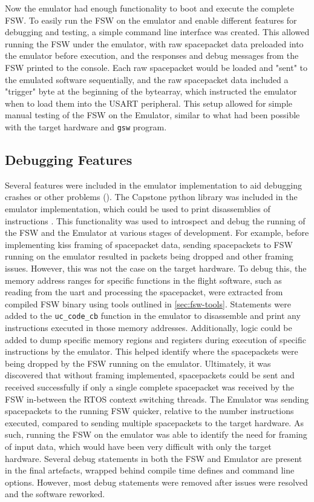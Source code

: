 \documentclass[../report.tex]{subfiles}
\begin{document}
Now the emulator had enough functionality to boot and execute the complete FSW.
To easily run the FSW on the emulator and enable different features for
debugging and testing, a simple command line interface was created. This allowed
running the FSW under the emulator, with raw spacepacket data preloaded into
the emulator before execution, and the responses and debug messages from the
FSW printed to the console. Each raw spacepacket would be loaded and "sent" to
the emulated software sequentially, and the raw spacepacket data included a
"trigger" byte at the beginning of the bytearray, which instructed the emulator
when to load them into the USART peripheral. This setup allowed for simple
manual testing of the FSW on the Emulator, similar to what had been possible
with the target hardware and \lstinline|gsw| program.

\subsection{Debugging Features}

Several features were included in the emulator implementation to aid debugging
crashes or other problems (). The Capstone python library was
included in the emulator implementation, which could be used to print
disassemblies of instructions \citep{Capstone}. This functionality was used to
introspect and debug the running of the FSW and the Emulator at various stages
of development. For example, before implementing kiss framing of spacepacket
data, sending spacepackets to FSW running on the emulator resulted in packets
being dropped and other framing issues. However, this was not the case on the
target hardware. To debug this, the memory address ranges for specific
functions in the flight software, such as reading from the uart and processing
the spacepacket, were extracted from compiled FSW binary using tools outlined
in \autoref{sec:fsw-tools}. Statements were added to the
\lstinline|uc_code_cb| function in the emulator to disassemble and print any
instructions executed in those memory addresses. Additionally, logic could be
added to dump specific memory regions and registers during execution of
specific instructions by the emulator. This helped identify where the
spacepackets were being dropped by the FSW running on the emulator. Ultimately,
it was discovered that without framing implemented, spacepackets could be sent
and received successfully if only a single complete spacepacket was received by
the FSW in-between the RTOS context switching threads. The Emulator was sending
spacepackets to the running FSW quicker, relative to the number instructions
executed, compared to sending multiple spacepackets to the target hardware. As
such, running the FSW on the emulator was able to identify the need for framing
of input data, which would have been very difficult with only the target
hardware. Several debug statements in both the FSW and Emulator are present in
the final artefacts, wrapped behind compile time defines and command line
options. However, most debug statements were removed after issues were resolved
and the software reworked.
\end{document}
